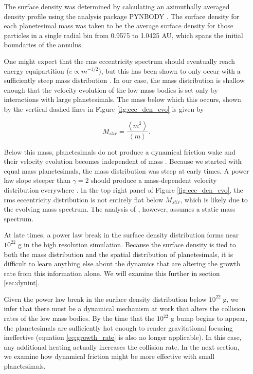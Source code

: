 The surface density was determined by calculating an azimuthally averaged density profile using the analysis package
{\sc PYNBODY} \cite{pontzen13}. The surface density for each planetesimal mass was taken to be the average surface density 
for those particles in a single radial bin from 0.9575 to 1.0425 AU, which spans the initial boundaries of the annulus.

One might expect that the rms eccentricity spectrum should eventually reach energy equipartition ($e \propto m^{-1/2}$), but this 
has been shown to only occur with a sufficiently steep mass distribution \cite{rafikov03}. In our case, the mass distribution is 
shallow enough that the velocity evolution of the low mass bodies is set only by interactions with large planetesimals. The mass 
below which this occurs, shown by the vertical dashed lines in Figure \ref{fig:ecc_den_evo} is given by
\cite{wetherill93, ormel10}

\begin{equation}\label{eq:mstir}
M_{stir} = \frac{\left< m^2 \right>}{\left< m \right>}.
\end{equation}

Below this mass, planetesimals do not produce a dynamical friction wake and their velocity evolution becomes independent of 
mass \cite{rafikov03}. Because we started with equal mass planetesimals, the mass distribution was steep at early times. A 
power law slope steeper than $\gamma = 2$ should produce a mass-dependent velocity distribution everywhere \cite{rafikov03}. In 
the top right panel of Figure \ref{fig:ecc_den_evo}, the rms eccentricity distribution is not entirely flat below $M_{stir}$, which is 
likely due to the evolving mass spectrum. The analysis of \cite{rafikov03}, however, assumes a static mass spectrum.

At late times, a power law break in the surface density distribution forms near $10^{22}$ g in the high resolution simulation. 
Because the surface density is tied to both the mass distribution and the spatial distribution of planetesimals, it is difficult to learn 
anything else about the dynamics that are altering the growth rate from this information alone. We will examine this further in 
section \ref{sec:dynint}.

Given the power law break in the surface density distribution below $10^{22}$ g, we infer that there must be a dynamical 
mechanism at work that alters the collision rates of the low mass bodies. By the time that the $10^{22}$ g bump begins to 
appear, the planetesimals are sufficiently hot enough to render gravitational focusing ineffective (equation \ref{eq:growth_rate} is 
also no longer applicable). In this case, any additional heating actually increases the collision rate. In the next section, we examine how dynamical friction might be more effective with small planetesimals.

